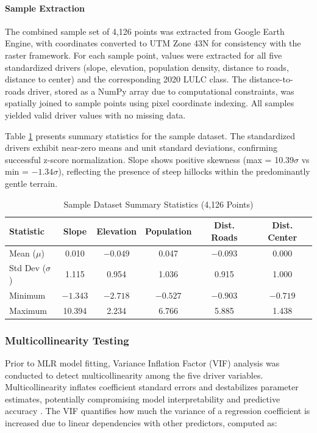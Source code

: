 \documentclass[conference]{IEEEtran}
\begin{document}
\paragraph{Sample Extraction}
The combined sample set of 4,126 points was extracted from Google Earth Engine, with coordinates converted to UTM Zone 43N for consistency with the raster framework. For each sample point, values were extracted for all five standardized drivers (slope, elevation, population density, distance to roads, distance to center) and the corresponding 2020 LULC class. The distance-to-roads driver, stored as a NumPy array due to computational constraints, was spatially joined to sample points using pixel coordinate indexing. All samples yielded valid driver values with no missing data.

Table \ref{tab:sample_summary} presents summary statistics for the sample dataset. The standardized drivers exhibit near-zero means and unit standard deviations, confirming successful z-score normalization. Slope shows positive skewness (max = 10.39$\sigma$ vs min = $-1.34\sigma$), reflecting the presence of steep hillocks within the predominantly gentle terrain.

\begin{table}[!t]
\caption{Sample Dataset Summary Statistics (4,126 Points)}
\label{tab:sample_summary}
\centering
\small
\renewcommand{\arraystretch}{1.1}
\begin{tabular}{lccccc}
\toprule
\textbf{Statistic} & \textbf{Slope} & \textbf{Elevation} & \textbf{Population} & \textbf{Dist. Roads} & \textbf{Dist. Center} \\
\midrule
Mean ($\mu$) & 0.010 & $-0.049$ & 0.047 & $-0.093$ & 0.000 \\
Std Dev ($\sigma$) & 1.115 & 0.954 & 1.036 & 0.915 & 1.000 \\
Minimum & $-1.343$ & $-2.718$ & $-0.527$ & $-0.903$ & $-0.719$ \\
Maximum & 10.394 & 2.234 & 6.766 & 5.885 & 1.438 \\
\bottomrule
\end{tabular}
\end{table}

\subsubsection{Multicollinearity Testing}

Prior to MLR model fitting, Variance Inflation Factor (VIF) analysis was conducted to detect multicollinearity among the five driver variables. Multicollinearity inflates coefficient standard errors and destabilizes parameter estimates, potentially compromising model interpretability and predictive accuracy . The VIF quantifies how much the variance of a regression coefficient is increased due to linear dependencies with other predictors, computed as:
\end{document}
